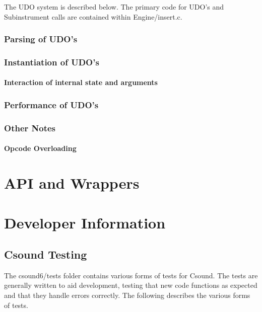 \documentclass[]{book}
\begin{document}
The UDO system is described below. The primary code for UDO's and Subinstrument calls are contained within Engine/insert.c.

\subsection{Parsing of UDO's}

\subsection{Instantiation of UDO's}

\subsubsection{Interaction of internal state and arguments}

\subsection{Performance of UDO's}

\subsection{Other Notes}

\subsubsection{Opcode Overloading}


\chapter{API and Wrappers}



\chapter{Developer Information}

\section{Csound Testing}

The csound6/tests folder contains various forms of tests for Csound. The
tests are generally written to aid development, testing that new code
functions as expected and that they handle errors correctly. The
following describes the various forms of tests.
\end{document}
